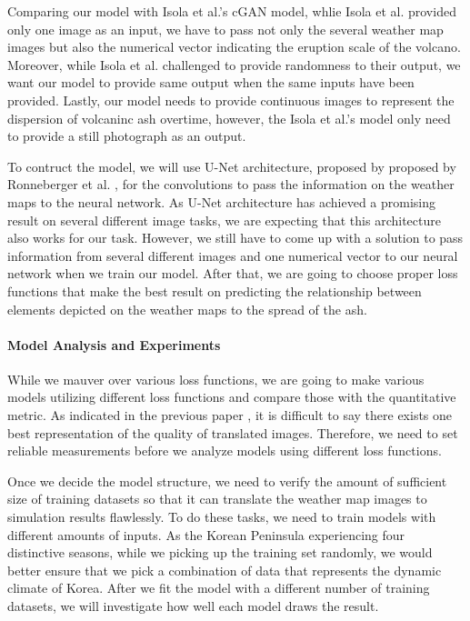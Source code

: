 \documentclass{article}
\begin{document}
\begin{doublespacing}
{  Comparing our model with Isola et al.\cite{isola2016imagetoimage}'s cGAN model, whlie Isola et 
  al. provided only one image as an input, we have to pass not only the several weather map images 
  but also the numerical vector indicating the eruption scale of the volcano. Moreover, while Isola 
  et al.\cite{isola2016imagetoimage} challenged to provide randomness to their output, we want our 
  model to provide same output when the same inputs have been provided. Lastly, our model needs to 
  provide continuous images to represent the dispersion of volcaninc ash overtime, however, the 
  Isola et al.\cite{isola2016imagetoimage}'s model only need to provide a still photograph as an 
  output.

  To contruct the model, we will use U-Net architecture, proposed by proposed by Ronneberger et al.
  \cite{ronneberger2015unet}, for the convolutions to pass the information on the weather maps to 
  the neural network. As U-Net architecture has achieved a promising result on several different 
  image tasks\cite{isola2016imagetoimage,james2018simtoreal}, we are expecting that this 
  architecture also works for our task. However, we still have to come up with a solution to pass 
  information from several different images and one numerical vector to our neural network when we 
  train our model. After that, we are going to choose proper loss functions that make the best 
  result on predicting the relationship between elements depicted on the weather maps to the spread 
  of the ash.

  \paragraph{Model Analysis and Experiments}
  While we mauver over various loss functions, we are going to make various models utilizing 
  different loss functions and compare those with the quantitative metric. As indicated in the 
  previous paper \cite{isola2016imagetoimage}, it is difficult to say there exists one best 
  representation of the quality of translated images. Therefore, we need to set reliable 
  measurements before we analyze models using different loss functions.

  Once we decide the model structure, we need to verify the amount of sufficient size of training 
  datasets so that it can translate the weather map images to simulation results flawlessly. To do 
  these tasks, we need to train models with different amounts of inputs. As the Korean Peninsula 
  experiencing four distinctive seasons, while we picking up the training set randomly, we would 
  better ensure that we pick a combination of data that represents the dynamic climate of Korea. 
  After we fit the model with a different number of training datasets, we will investigate how well 
  each model draws the result.
}


\end{doublespacing}
\end{document}
